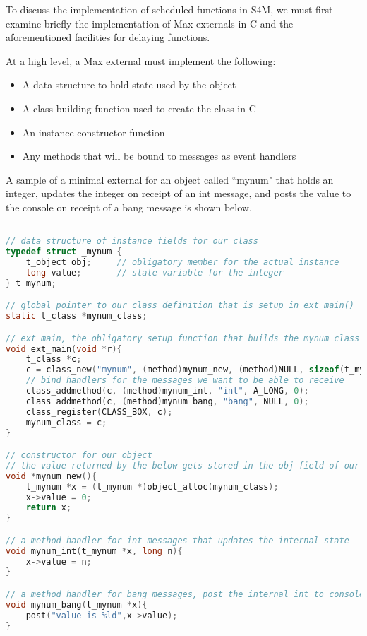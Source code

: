 \documentclass[acmsmall]{acmart}
\begin{document}
To discuss the implementation of scheduled functions in S4M, we must first examine
briefly the implementation of Max externals in C and the aforementioned 
facilities for delaying functions.

At a high level, a Max external must implement the following:
\begin{itemize}
\item A data structure to hold state used by the object
\item A class building function used to create the class in C
\item An instance constructor function 
\item Any methods that will be bound to messages as event handlers
\end{itemize}

A sample of a minimal external for an object called ``mynum" 
that holds an integer, updates the integer on receipt of an int 
message, and posts the value to the console on receipt of a bang
message is shown below.

\begin{lstlisting}[language=C]

// data structure of instance fields for our class
typedef struct _mynum {
    t_object obj;     // obligatory member for the actual instance 
    long value;       // state variable for the integer
} t_mynum;

// global pointer to our class definition that is setup in ext_main()
static t_class *mynum_class; 

// ext_main, the obligatory setup function that builds the mynum class
void ext_main(void *r){
    t_class *c;
    c = class_new("mynum", (method)mynum_new, (method)NULL, sizeof(t_mynum), 0L, 0);
    // bind handlers for the messages we want to be able to receive
    class_addmethod(c, (method)mynum_int, "int", A_LONG, 0);
    class_addmethod(c, (method)mynum_bang, "bang", NULL, 0);
    class_register(CLASS_BOX, c);
    mynum_class = c;
}

// constructor for our object
// the value returned by the below gets stored in the obj field of our t_mynum struct
void *mynum_new(){
    t_mynum *x = (t_mynum *)object_alloc(mynum_class);
    x->value = 0;
    return x;
}

// a method handler for int messages that updates the internal state
void mynum_int(t_mynum *x, long n){
    x->value = n;
}

// a method handler for bang messages, post the internal int to console
void mynum_bang(t_mynum *x){
    post("value is %ld",x->value);
}

\end{lstlisting}
\end{document}
